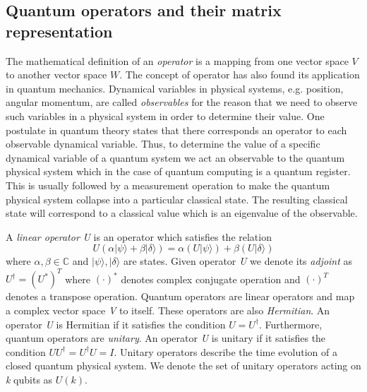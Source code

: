 \subsection{Quantum operators and their matrix representation}
The mathematical definition of an \textit{operator} is a mapping from one vector space $V$ to another vector space $W$. The concept of operator has also found its application in quantum mechanics. Dynamical variables in physical systems, e.g. position, angular momentum, are called \textit{observables} for the reason that we need to observe such variables in a physical system in order to determine their value. One postulate in quantum theory states that there corresponds an operator to each observable dynamical variable. Thus, to determine the value of a specific dynamical variable of a quantum system we act an observable to the quantum physical system which in the case of quantum computing is a quantum register. This is usually followed by a measurement operation to make the quantum physical system collapse into a particular classical state. The resulting classical state will correspond to a classical value which is an eigenvalue of the observable.

A \textit{linear operator} \textit{U} is an operator which satisfies the relation 
\[
	U\left( \alpha \vert \psi \rangle + \beta \vert \delta \rangle \right) = \alpha\left( U\vert \psi \rangle \right) + \beta\left( U\vert \delta \rangle \right)
\]
where $\alpha, \beta \in \mathbb{C}$ and $\vert \psi \rangle, \vert \delta \rangle$ are states. Given operator \textit{U} we denote its \textit{adjoint} as $U^{\dagger}=\left(U^{*}\right)^T$ where $(\cdot)^{*}$ denotes complex conjugate operation and $(\cdot)^{T}$ denotes a transpose operation. Quantum operators are linear operators and map a complex vector space \textit{V} to itself. These operators are also \textit{Hermitian}. An operator \textit{U} is Hermitian if it satisfies the condition $U=U^{\dagger}$. Furthermore, quantum operators are \textit{unitary}. An operator \textit{U} is unitary if it satisfies the condition $UU^{\dagger} = U^{\dagger}U = I$. Unitary operators describe the time evolution of a closed quantum physical system. We denote the set of unitary operators acting on \textit{k} qubits as $U(k)$.

